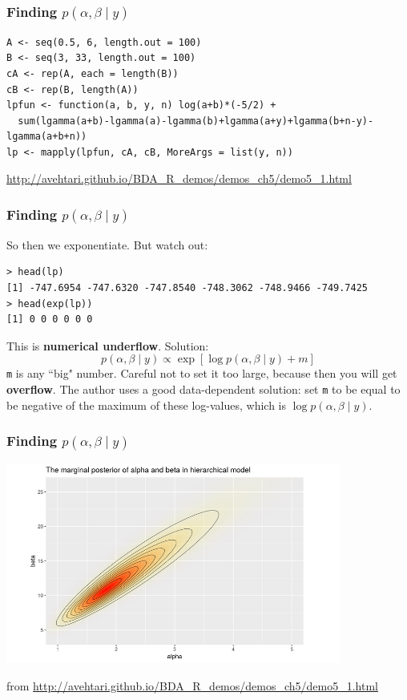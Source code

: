\documentclass{beamer}
\begin{document}
\begin{frame}[fragile]
\frametitle{Finding $p(\alpha,\beta \mid y)$ }

\begin{verbatim}
A <- seq(0.5, 6, length.out = 100)
B <- seq(3, 33, length.out = 100)
cA <- rep(A, each = length(B))
cB <- rep(B, length(A))
lpfun <- function(a, b, y, n) log(a+b)*(-5/2) +
  sum(lgamma(a+b)-lgamma(a)-lgamma(b)+lgamma(a+y)+lgamma(b+n-y)-lgamma(a+b+n))
lp <- mapply(lpfun, cA, cB, MoreArgs = list(y, n))
\end{verbatim}


\url{http://avehtari.github.io/BDA_R_demos/demos_ch5/demo5_1.html}

\end{frame}


\begin{frame}[fragile]
\frametitle{Finding $p(\alpha,\beta \mid y)$ }

So then we exponentiate. But watch out: 
\begin{verbatim}
> head(lp)
[1] -747.6954 -747.6320 -747.8540 -748.3062 -748.9466 -749.7425
> head(exp(lp))
[1] 0 0 0 0 0 0
\end{verbatim}
\pause

This is {\bf numerical underflow}. Solution:
\[
p(\alpha, \beta \mid y) \propto \exp[\log p(\alpha, \beta \mid y) + m]
\]
\verb|m| is any ``big" number. Careful not to set it too large, because then you will get {\bf overflow}. The author uses a good data-dependent solution: set \verb|m| to be equal to be negative of the maximum of these log-values, which is $\log p(\alpha, \beta \mid y)$. 

\end{frame}

\begin{frame}[fragile]
\frametitle{Finding $p(\alpha,\beta \mid y)$ }

\begin{center}
\includegraphics[width=110mm]{marg_posterior.png}
\end{center}
from \url{http://avehtari.github.io/BDA_R_demos/demos_ch5/demo5_1.html}
\end{frame}
\end{document}

